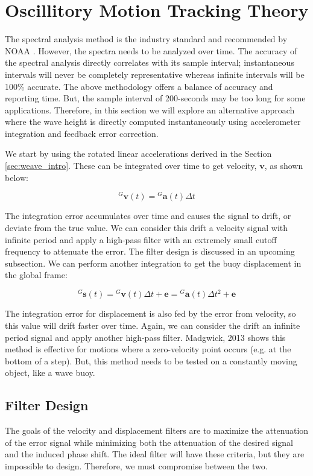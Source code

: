 \section{Oscillitory Motion Tracking Theory}

The spectral analysis method is the industry standard and recommended by NOAA \cite{NOAAWaveMeasure}. 
However, the spectra needs to be analyzed over time. 
The accuracy of the spectral analysis directly correlates with its sample interval; instantaneous intervals will never be completely representative whereas infinite intervals will be 100\% accurate.
The above methodology offers a balance of accuracy and reporting time. 
But, the sample interval of 200-seconds may be too long for some applications. 
Therefore, in this section we will explore an alternative approach where the wave height is directly computed instantaneously using accelerometer integration and feedback error correction.

We start by using the rotated linear accelerations derived in the Section \ref{sec:weave_intro}. 
These can be integrated over time to get velocity, $\pmb{v}$, as shown below:

\begin{equation}
    {}^G\pmb{v}(t) = {}^G\pmb{a}(t) \Delta t
\end{equation}

The integration error accumulates over time and causes the signal to drift, or deviate from the true value. 
We can consider this drift a velocity signal with infinite period and apply a high-pass filter with an extremely small cutoff frequency to attenuate the error. 
The filter design is discussed in an upcoming subsection. 
We can perform another integration to get the buoy displacement in the global frame:

\begin{equation}
    {}^G\pmb{s}(t) = {}^G\pmb{v}(t)\Delta t + \pmb{e} = {}^G\pmb{a}(t) \Delta t^2 + \pmb{e}
\end{equation}

The integration error for displacement is also fed by the error from velocity, so this value will drift faster over time. 
Again, we can consider the drift an infinite period signal and apply another high-pass filter. 
Madgwick, 2013 shows this method is effective for motions where a zero-velocity point occurs (e.g. at the bottom of a step). 
But, this method needs to be tested on a constantly moving object, like a wave buoy.

\subsection{Filter Design}
The goals of the velocity and displacement filters are to maximize the attenuation of the error signal while minimizing both the attenuation of the desired signal and the induced phase shift. 
The ideal filter will have these criteria, but they are impossible to design. 
Therefore, we must compromise between the two.

